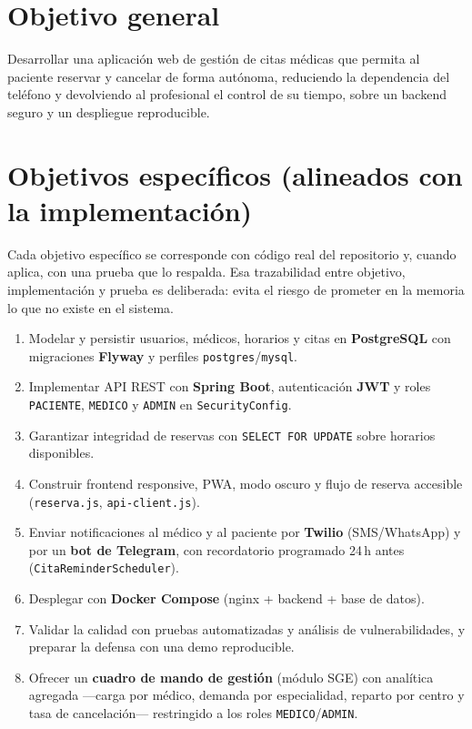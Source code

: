 \documentclass[12pt,a4paper]{report}
\begin{document}
\section{Objetivo general}

Desarrollar una aplicación web de gestión de citas médicas que permita al paciente reservar y cancelar de forma autónoma, reduciendo la dependencia del teléfono y devolviendo al profesional el control de su tiempo, sobre un backend seguro y un despliegue reproducible.

\section{Objetivos específicos (alineados con la implementación)}

Cada objetivo específico se corresponde con código real del repositorio y, cuando aplica, con una prueba que lo respalda. Esa trazabilidad entre objetivo, implementación y prueba es deliberada: evita el riesgo de prometer en la memoria lo que no existe en el sistema.

\begin{enumerate}
  \item Modelar y persistir usuarios, médicos, horarios y citas en \textbf{PostgreSQL} con migraciones \textbf{Flyway} y perfiles \texttt{postgres}/\texttt{mysql}.
  \item Implementar API REST con \textbf{Spring Boot}, autenticación \textbf{JWT} y roles \texttt{PACIENTE}, \texttt{MEDICO} y \texttt{ADMIN} en \texttt{SecurityConfig}.
  \item Garantizar integridad de reservas con \texttt{SELECT FOR UPDATE} sobre horarios disponibles.
  \item Construir frontend responsive, PWA, modo oscuro y flujo de reserva accesible (\texttt{reserva.js}, \texttt{api-client.js}).
  \item Enviar notificaciones al médico y al paciente por \textbf{Twilio} (SMS/WhatsApp) y por un \textbf{bot de Telegram}, con recordatorio programado 24\,h antes (\texttt{CitaReminderScheduler}).
  \item Desplegar con \textbf{Docker Compose} (nginx + backend + base de datos).
  \item Validar la calidad con pruebas automatizadas y análisis de vulnerabilidades, y preparar la defensa con una demo reproducible.
  \item Ofrecer un \textbf{cuadro de mando de gestión} (módulo SGE) con analítica agregada —carga por médico, demanda por especialidad, reparto por centro y tasa de cancelación— restringido a los roles \texttt{MEDICO}/\texttt{ADMIN}.
\end{enumerate}
\end{document}
